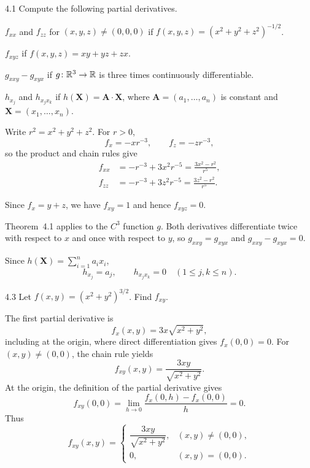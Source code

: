 \documentclass[11pt,oneside]{article}
\begin{document}
\begin{problem}{4.1}
Compute the following partial derivatives.
\begin{problemsubparts}
\item $f_{xx}$ and $f_{zz}$ for $(x,y,z)\ne(0,0,0)$ if
      $f(x,y,z)=(x^2+y^2+z^2)^{-1/2}$.
\item $f_{xyz}$ if $f(x,y,z)=xy+yz+zx$.
\item $g_{xxy}-g_{xyx}$ if $g\colon\mathbb{R}^3\to\mathbb{R}$ is three times
      continuously differentiable.
\item $h_{x_j}$ and $h_{x_jx_k}$ if $h(\mathbf X)=\mathbf A\cdot\mathbf X$,
      where $\mathbf A=(a_1,\dots,a_n)$ is constant and
      $\mathbf X=(x_1,\dots,x_n)$.
\end{problemsubparts}
\end{problem}
\begin{solution}
\begin{problemsubparts}
\item Write $r^2=x^2+y^2+z^2$. For $r>0$,
\[
 f_x=-xr^{-3},\qquad f_z=-zr^{-3},
\]
so the product and chain rules give
\[
\begin{aligned}
 f_{xx}&=-r^{-3}+3x^2r^{-5}
      =\boxed{\frac{3x^2-r^2}{r^5}},\\
 f_{zz}&=-r^{-3}+3z^2r^{-5}
      =\boxed{\frac{3z^2-r^2}{r^5}}.
\end{aligned}
\]
\item Since $f_x=y+z$, we have $f_{xy}=1$ and hence
$\boxed{f_{xyz}=0}$.
\item Theorem~4.1 applies to the $C^3$ function $g$.
Both derivatives differentiate twice with respect to $x$ and once
with respect to $y$, so $g_{xxy}=g_{xyx}$ and
$\boxed{g_{xxy}-g_{xyx}=0}$.
\item Since $h(\mathbf X)=\sum_{i=1}^n a_ix_i$,
\[
 \boxed{h_{x_j}=a_j},\qquad \boxed{h_{x_jx_k}=0}
 \quad(1\le j,k\le n).
\]
\end{problemsubparts}
\end{solution}

\begin{problem}{4.3}
Let $f(x,y)=(x^2+y^2)^{3/2}$. Find $f_{xy}$.
\end{problem}
\begin{solution}
The first partial derivative is
\[
 f_x(x,y)=3x\sqrt{x^2+y^2},
\]
including at the origin, where direct differentiation gives $f_x(0,0)=0$.
For $(x,y)\ne(0,0)$, the chain rule yields
\[
 f_{xy}(x,y)=\frac{3xy}{\sqrt{x^2+y^2}}.
\]
At the origin, the definition of the partial derivative gives
\[
 f_{xy}(0,0)=\lim_{h\to0}\frac{f_x(0,h)-f_x(0,0)}{h}=0.
\]
Thus
\[
\boxed{f_{xy}(x,y)=
 \begin{cases}
 \dfrac{3xy}{\sqrt{x^2+y^2}},&(x,y)\ne(0,0),\\[5pt]
 0,&(x,y)=(0,0).
 \end{cases}}
\]
\end{solution}
\end{document}

